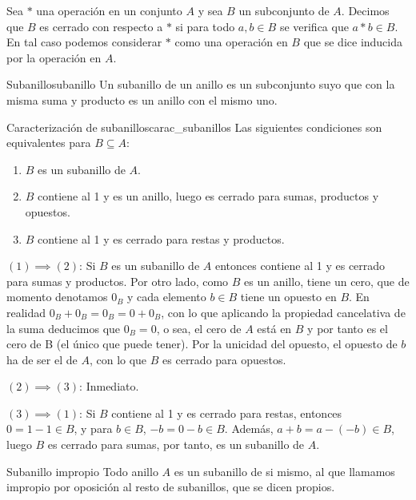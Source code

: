 Sea $*$ una operación en un conjunto $A$ y sea $B$ un subconjunto de $A$. Decimos que $B$ es cerrado con respecto a $*$ si para todo $a, b \in B$ se verifica que $a * b \in B$. En tal caso podemos
considerar $*$ como una operación en $B$ que se dice inducida por la operación en $A$.

\begin{definition}{Subanillo}{subanillo}
    Un subanillo de un anillo es un subconjunto suyo que con la misma suma y producto es un anillo con el mismo uno.
\end{definition}

\begin{proposition}{Caracterización de subanillos}{carac_subanillos}
    Las siguientes condiciones son equivalentes para \( B \subseteq A \):
    \begin{enumerate}
    \item \( B \) es un subanillo de \( A \).
    \item \( B \) contiene al 1 y es un anillo, luego es cerrado para sumas, productos y opuestos.
    \item \( B \) contiene al 1 y es cerrado para restas y productos.
    \end{enumerate}
\end{proposition}

\begin{proofbox}
    $(1) \implies (2)$: Si \( B \) es un subanillo de \(A\) entonces contiene al 1 y es cerrado para sumas y productos. Por otro lado, como $B$ es un anillo, tiene un cero, que de momento denotamos $0_B$ y cada elemento $b \in B$ tiene un opuesto en $B$. En realidad $0_B + 0_B = 0_B = 0 + 0_B$, con lo que aplicando la propiedad cancelativa de la suma deducimos que $0_B = 0$, o sea, el cero de $A$ está en $B$ y por tanto es el cero de B (el único que puede tener). Por la unicidad del opuesto, el opuesto de $b$ ha de ser el de $A$, con lo que $B$ es cerrado para opuestos.

    \noindent$(2) \implies (3)$: Inmediato.

    \noindent$(3) \implies (1)$: Si \( B \) contiene al 1 y es cerrado para restas, entonces \( 0 = 1 - 1 \in B \), y para \( b \in B \), \(-b = 0 - b \in B \). Además, \( a + b = a - (-b) \in B \), luego \( B \) es cerrado para sumas, por tanto, es un subanillo de $A$.
\end{proofbox}

\begin{example}{Subanillo impropio}{}
    Todo anillo $A$ es un subanillo de si mismo, al que llamamos impropio por oposición al resto de subanillos, que se dicen propios.
\end{example}

